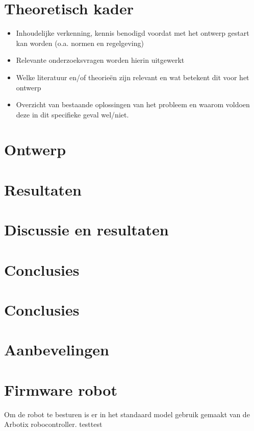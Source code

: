 \documentclass[10pt,a4paper]{article}
\begin{document}
\newpage

\section{Theoretisch kader}
\begin{itemize}
\setlength\itemsep{0em}
\item Inhoudelijke verkenning, kennis benodigd voordat met het ontwerp gestart kan worden (o.a. normen en regelgeving)
\item Relevante onderzoeksvragen worden hierin uitgewerkt 
\item Welke literatuur en/of theorieën zijn relevant en wat betekent dit voor het ontwerp \item Overzicht van bestaande oplossingen van het probleem en waarom voldoen deze in dit specifieke geval wel/niet.
\end{itemize}
\newpage

\section{Ontwerp}



\section{Resultaten}


\section{Discussie en resultaten}

\section{Conclusies}

\section{Conclusies}

\section{Aanbevelingen}




\section{Firmware robot}
Om de robot te besturen is er in het standaard model gebruik gemaakt van de Arbotix robocontroller. 
testtest
\end{document}
